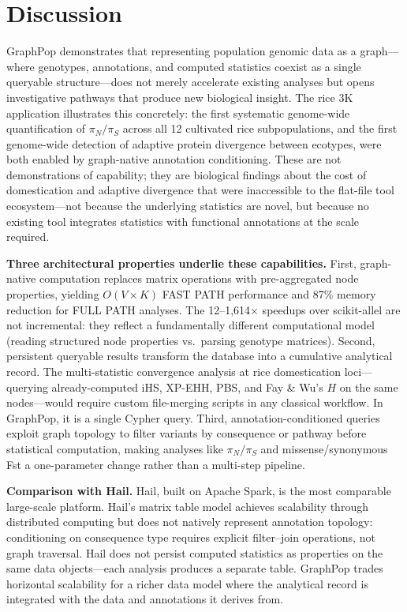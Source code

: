 \section*{Discussion}

GraphPop demonstrates that representing population genomic data as a graph---where genotypes, annotations, and computed statistics coexist as a single queryable structure---does not merely accelerate existing analyses but opens investigative pathways that produce new biological insight. The rice 3K application illustrates this concretely: the first systematic genome-wide quantification of $\pi_N/\pi_S$ across all 12 cultivated rice subpopulations, and the first genome-wide detection of adaptive protein divergence between ecotypes, were both enabled by graph-native annotation conditioning. These are not demonstrations of capability; they are biological findings about the cost of domestication and adaptive divergence that were inaccessible to the flat-file tool ecosystem---not because the underlying statistics are novel, but because no existing tool integrates statistics with functional annotations at the scale required.

\textbf{Three architectural properties underlie these capabilities.} First, graph-native computation replaces matrix operations with pre-aggregated node properties, yielding $O(V \times K)$ FAST PATH performance and 87\% memory reduction for FULL PATH analyses. The 12--1{,}614$\times$ speedups over scikit-allel are not incremental: they reflect a fundamentally different computational model (reading structured node properties vs.\ parsing genotype matrices). Second, persistent queryable results transform the database into a cumulative analytical record. The multi-statistic convergence analysis at rice domestication loci---querying already-computed iHS, XP-EHH, PBS, and Fay \& Wu's $H$ on the same nodes---would require custom file-merging scripts in any classical workflow. In GraphPop, it is a single Cypher query. Third, annotation-conditioned queries exploit graph topology to filter variants by consequence or pathway before statistical computation, making analyses like $\pi_N/\pi_S$ and missense/synonymous Fst a one-parameter change rather than a multi-step pipeline.

\textbf{Comparison with Hail.} Hail\cite{hail2024}, built on Apache Spark, is the most comparable large-scale platform. Hail's matrix table model achieves scalability through distributed computing but does not natively represent annotation topology: conditioning on consequence type requires explicit filter--join operations, not graph traversal. Hail does not persist computed statistics as properties on the same data objects---each analysis produces a separate table. GraphPop trades horizontal scalability for a richer data model where the analytical record is integrated with the data and annotations it derives from.


